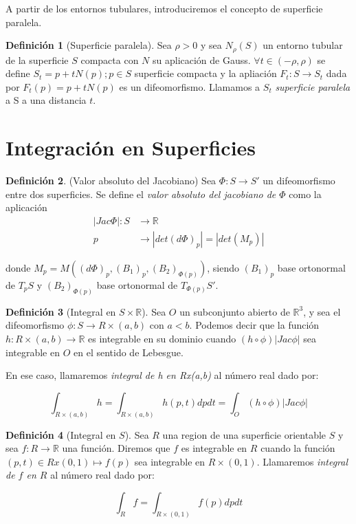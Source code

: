 \documentclass[paper=a4, fontsize=11pt, spanish]{scrartcl}
\newcommand{\rtres}{\mathbb{R}^3}
\theoremstyle{definition}
\theoremstyle{definition}
\newtheorem{definition}{Definición}
\theoremstyle{definition}
\begin{document}
A partir de los entornos tubulares, introduciremos el concepto de superficie paralela.

\begin{definition}[Superficie paralela]
Sea $\rho > 0$ y sea $N_\rho(S)$ un entorno tubular de la superficie $S$ compacta con $N$ su aplicación de Gauss. $\forall t \in (-\rho, \rho)$ se define $S_t={p + tN(p); p \in S}$ superficie compacta y la apliación $F_t: S \longrightarrow S_t$ dada por $F_t(p)=p+tN(p)$ es un difeomorfismo.
Llamamos a $S_t$ \textit{superficie paralela} a S a una distancia $t$.
\end{definition}


\section{Integración en Superficies}

\begin{definition}(Valor absoluto del Jacobiano)
Sea $\Phi: S \longrightarrow S'$ un difeomorfismo entre dos superficies. Se define el \textit{valor absoluto del jacobiano de $\Phi$} como la aplicación
\begin{align*}
    |Jac \Phi|: S &\longrightarrow \mathbb{R} \\
    p &\longrightarrow |det(d\Phi)_p| = |det(M_p)|
\end{align*}

donde $M_p=M((d\Phi)_p, (B_1)_p, (B_2)_{\Phi(p)})$, siendo $(B_1)_p$ base ortonormal de $T_pS$ y $(B_2)_{\Phi(p)}$ base ortonormal de $T_{\Phi(p)}S'$.
\end{definition}

\begin{definition}[Integral en $S \times \mathbb{R}$]
Sea $O$ un subconjunto abierto de $\rtres$, y sea el difeomorfismo $\phi: S \longrightarrow R \times (a,b)$ con $a < b$. Podemos decir que la función $h: R \times (a,b) \longrightarrow \mathbb{R}$ es integrable en su dominio cuando $(h \circ \phi)|Jac \phi|$ sea integrable en $O$ en el sentido de Lebesgue.

En ese caso, llamaremos \textit{integral de h en Rx(a,b)} al número real dado por:

\begin{equation*}
    \int_{R \times (a,b)} h = \int_{R \times (a,b)} h(p, t)dp dt = \int_{O} (h \circ \phi)|Jac \phi|
\end{equation*}
\end{definition}

\begin{definition}[Integral en $S$]
Sea $R$ una region de una superficie orientable $S$ y sea $f:R \longrightarrow \mathbb{R}$ una función. Diremos que $f$ es integrable en $R$ cuando la función $(p,t) \in Rx(0,1) \mapsto f(p)$ sea integrable en $R \times (0,1)$. Llamaremos \textit{integral de $f$ en $R$} al número real dado por:

\begin{equation*}
    \int_{R} f = \int_{R \times (0,1)} f(p)dp dt
\end{equation*}
\end{definition}
\end{document}
